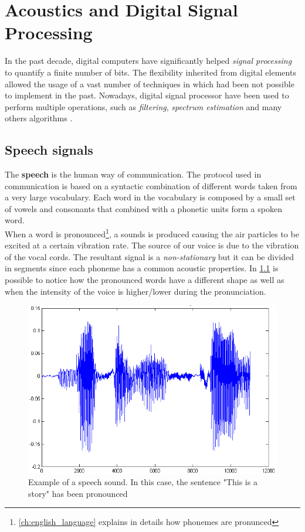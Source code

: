 \chapter{Acoustics and Digital Signal Processing}
\label{ch:speech analysis}
In the past decade, digital computers have significantly helped \textit{signal processing} to quantify a finite number of bits. The flexibility inherited from digital elements allowed the usage of a vast number of techniques in which had been not possible to implement in the past. Nowadays, digital signal processor have been used to perform multiple operations, such as \textit{filtering}, \textit{spectrum estimation} and many others algorithms \cite{orfanidis1995introduction}.


\section{Speech signals}
\label{sec:speech_signals}
The \textbf{speech} is the human way of communication. The protocol used in communication is based on a syntactic combination of different words taken from a very large vocabulary. Each word in the vocabulary is composed by a small set of vowels and consonants that combined with a phonetic units form a spoken word. \\
\noindent When a word is pronounced\footnote{\ref{ch:english_language} explains in details how phonemes are pronunced}, a sounds is produced causing the air particles to be excited at a certain vibration rate. The source of our voice is due to the vibration of the vocal cords. The resultant signal is a \textit{non-stationary} but it can be divided in segments since each phoneme has a common acoustic properties. In \ref{fig:ex_sound_wave} is possible to notice how the pronounced words have a different shape as well as when the intensity of the voice is higher/lower during the pronunciation.
 
\begin{figure}[!ht]
	\centering
	\includegraphics[scale=0.4]{Figures/ex_speech.png}
	\caption{Example of a speech sound. In this case, the sentence "This is a story" has been pronounced \cite{ex_speech_image}}
	\label{fig:ex_sound_wave}
\end{figure}

